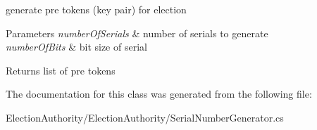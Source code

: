 generate pre tokens (key pair) for election 


\begin{DoxyParams}{Parameters}
{\em number\+Of\+Serials} & number of serials to generate\\
\hline
{\em number\+Of\+Bits} & bit size of serial\\
\hline
\end{DoxyParams}
\begin{DoxyReturn}{Returns}
list of pre tokens
\end{DoxyReturn}


The documentation for this class was generated from the following file\+:\begin{DoxyCompactItemize}
\item 
Election\+Authority/\+Election\+Authority/Serial\+Number\+Generator.\+cs\end{DoxyCompactItemize}

